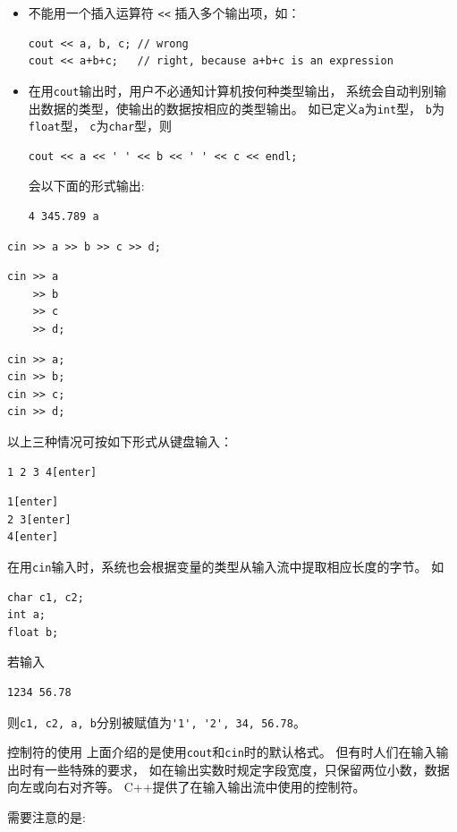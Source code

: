 \begin{frame}[fragile]{\secname}
  \begin{free}[注]{}
    \begin{itemize}
    \item 不能用一个插入运算符 \lstinline|<<| 插入多个输出项，如：
      \begin{lstlisting}
cout << a, b, c; // wrong
cout << a+b+c;   // right, because a+b+c is an expression        
      \end{lstlisting}

    \item 在用\lstinline|cout|输出时，用户不必通知计算机按何种类型输出，
      系统会自动判别输出数据的类型，使输出的数据按相应的类型输出。
      如已定义\lstinline|a|为\lstinline|int|型，
      \lstinline|b|为\lstinline|float|型，
      \lstinline|c|为\lstinline|char|型，则
      \begin{lstlisting}
cout << a << ' ' << b << ' ' << c << endl;        
      \end{lstlisting}
      会以下面的形式输出:
      \begin{lstlisting}
4 345.789 a        
      \end{lstlisting}
    \end{itemize}
  \end{free}
\end{frame}

\begin{frame}[fragile]{\secname}
  \begin{lstlisting}
cin >> a >> b >> c >> d;    
  \end{lstlisting}\pause
  \begin{lstlisting}
cin >> a
    >> b
    >> c
    >> d;        
  \end{lstlisting}\pause
  \begin{lstlisting}
cin >> a;
cin >> b;
cin >> c;
cin >> d;    
\end{lstlisting}
以上三种情况可按如下形式从键盘输入：
\begin{lstlisting}
1 2 3 4[enter]  
\end{lstlisting}
\begin{lstlisting}
1[enter]
2 3[enter]
4[enter]  
\end{lstlisting}
\end{frame}

\begin{frame}[fragile]{\secname}
  \begin{free}[注]{}
    在用\lstinline|cin|输入时，系统也会根据变量的类型从输入流中提取相应长度的字节。
    如
    \begin{lstlisting}
char c1, c2;
int a;
float b;
\end{lstlisting}
若输入
\begin{lstlisting}
1234 56.78  
\end{lstlisting}
则\lstinline|c1, c2, a, b|分别被赋值为\lstinline|'1', '2', 34, 56.78|。
  \end{free}
\end{frame}


\begin{frame}[fragile]{控制符的使用}
  上面介绍的是使用\lstinline|cout|和\lstinline|cin|时的默认格式。
  但有时人们在输入输出时有一些特殊的要求，
  如在输出实数时规定字段宽度，只保留两位小数，数据向左或向右对齐等。
  C++提供了在输入输出流中使用的控制符。

  需要注意的是: 
\end{frame}